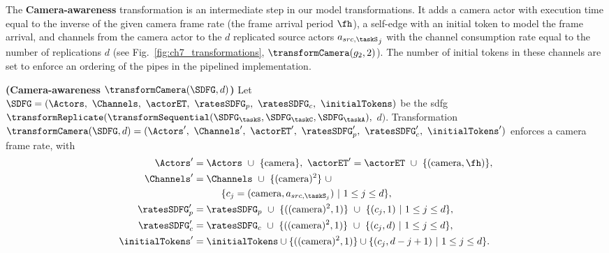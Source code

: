  
The \textbf{Camera-awareness} transformation is an intermediate step in our model transformations. 
It adds a camera actor with execution time equal to the inverse of the given camera frame rate (the frame arrival period $\fh$), a self-edge with an initial token to model the frame arrival, and channels from the camera actor to the $d$ replicated source actors ${a_{src,{\taskS}}}_j$ with the channel consumption rate equal to the number of replications $d$ (see Fig.~\ref{fig:ch7_transformations}, $\transformCamera(g_2,2)$). The number of initial tokens in these channels are set to enforce an ordering of the pipes in the pipelined implementation.
\begin{definition}
{\textbf{(Camera-awareness $\transformCamera(\SDFG,d)$)}}
Let $\SDFG = (\Actors,\ \Channels,\ \actorET,\ \ratesSDFG_p,\ \ratesSDFG_c,\ \initialTokens)$ be the \gls{sdfg} $\transformReplicate(\transformSequential(\SDFG_{\taskS},\SDFG_{\taskC},\SDFG_{\taskA}),$ $d)$. 
Transformation $\transformCamera(\SDFG,d)= (\Actors^{\prime},\ \Channels^{\prime},\ \actorET^{\prime},\ \ratesSDFG_p^{\prime},\ \ratesSDFG_c^{\prime},\ \initialTokens^{\prime})$ enforces a camera frame rate, with
\begin{align}
\Actors^{\prime}&=\Actors\ \cup\ \{\text{camera}\},\ \actorET^{\prime}=\actorET\ \cup\ \{(\text{camera},\fh)\}, \nonumber\\
\Channels^{\prime}&=\Channels\ \cup\ \{(\text{camera})^2\}\ \cup\nonumber\\ &\hspace*{10mm}\{c_j=(\text{camera},a_{src,{{\taskS}_j}})\ |\ 1\le j\le d\}, \nonumber\\
\ratesSDFG_p^{\prime}&=\ratesSDFG_p\ \cup\ \{((\text{camera})^2,1)\}\ \cup\ \{(c_j,1)\ |\ 1\le j\le d\},\nonumber\\
\ratesSDFG_c^{\prime}&=\ratesSDFG_c\ \cup\ \{((\text{camera})^2,1)\}\ \cup\ \{(c_j,d)\ |\ 1\le j\le d\},\nonumber\\
\initialTokens^{\prime}&=\initialTokens\cup\{((\text{camera})^2,1)\}\cup\{(c_j,d-j+1)\ |\ 1\le j\le d\}.\nonumber
\end{align}

\end{definition}

